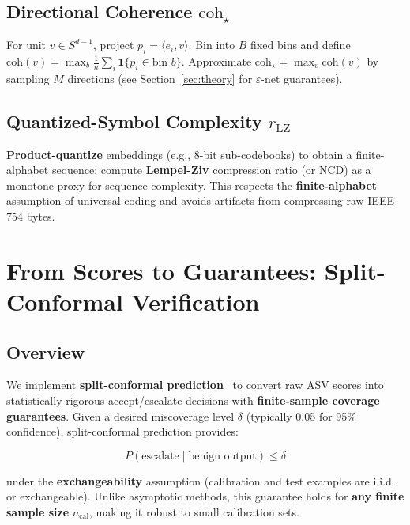 \documentclass[10pt]{article}
\begin{document}
\subsection{Directional Coherence $\mathrm{coh}_\star$}
\label{sec:signal-coh}

For unit $v\in S^{d-1}$, project $p_i=\langle e_i,v\rangle$. Bin into $B$ fixed bins and define $\mathrm{coh}(v)=\max_b \frac{1}{n}\sum_i \mathbf{1}\{p_i\in\text{bin }b\}$. Approximate $\mathrm{coh}_\star=\max_v \mathrm{coh}(v)$ by sampling $M$ directions (see Section~\ref{sec:theory} for $\varepsilon$-net guarantees).

\subsection{Quantized-Symbol Complexity $r_{\mathrm{LZ}}$}
\label{sec:signal-rlz}

\textbf{Product-quantize} embeddings (e.g., 8-bit sub-codebooks) to obtain a finite-alphabet sequence; compute \textbf{Lempel-Ziv} compression ratio (or NCD) as a monotone proxy for sequence complexity. This respects the \textbf{finite-alphabet} assumption of universal coding and avoids artifacts from compressing raw IEEE-754 bytes.

\section{From Scores to Guarantees: Split-Conformal Verification}
\label{sec:conformal}

\subsection{Overview}
\label{sec:conformal-overview}

We implement \textbf{split-conformal prediction}~\cite{vovk2005algorithmic,lei2018distribution,angelopoulos2023gentle} to convert raw ASV scores into statistically rigorous accept/escalate decisions with \textbf{finite-sample coverage guarantees}. Given a desired miscoverage level $\delta$ (typically 0.05 for 95\% confidence), split-conformal prediction provides:

\begin{equation}
P(\text{escalate} \mid \text{benign output}) \le \delta
\end{equation}

under the \textbf{exchangeability} assumption (calibration and test examples are i.i.d. or exchangeable). Unlike asymptotic methods, this guarantee holds for \textbf{any finite sample size} $n_{\text{cal}}$, making it robust to small calibration sets.
\end{document}
